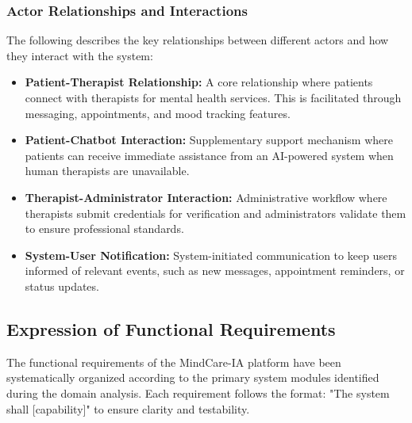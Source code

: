 \subsubsection{Actor Relationships and Interactions}
The following describes the key relationships between different actors and how they interact with the system:

\begin{itemize}
    \item \textbf{Patient-Therapist Relationship:} A core relationship where patients connect with therapists for mental health services. This is facilitated through messaging, appointments, and mood tracking features.
    
    \item \textbf{Patient-Chatbot Interaction:} Supplementary support mechanism where patients can receive immediate assistance from an AI-powered system when human therapists are unavailable.
    
    \item \textbf{Therapist-Administrator Interaction:} Administrative workflow where therapists submit credentials for verification and administrators validate them to ensure professional standards.
    
    \item \textbf{System-User Notification:} System-initiated communication to keep users informed of relevant events, such as new messages, appointment reminders, or status updates.
\end{itemize}

\subsection{Expression of Functional Requirements}
The functional requirements of the MindCare-IA platform have been systematically organized according to the primary system modules identified during the domain analysis. Each requirement follows the format: "The system shall [capability]" to ensure clarity and testability.

